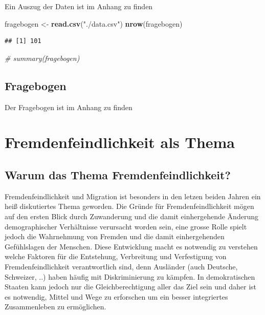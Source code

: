 \documentclass[]{article}
\newenvironment{Shaded}{\begin{snugshade}}{\end{snugshade}}
\newcommand{\KeywordTok}[1]{\textcolor[rgb]{0.13,0.29,0.53}{\textbf{{#1}}}}
\newcommand{\StringTok}[1]{\textcolor[rgb]{0.31,0.60,0.02}{{#1}}}
\newcommand{\CommentTok}[1]{\textcolor[rgb]{0.56,0.35,0.01}{\textit{{#1}}}}
\newcommand{\NormalTok}[1]{{#1}}
\begin{document}
Ein Auszug der Daten ist im Anhang zu finden

\begin{Shaded}
\begin{Highlighting}[]
\NormalTok{fragebogen <-}\StringTok{ }\KeywordTok{read.csv}\NormalTok{(}\StringTok{"./data.csv"}\NormalTok{)}
\KeywordTok{nrow}\NormalTok{(fragebogen)}
\end{Highlighting}
\end{Shaded}

\begin{verbatim}
## [1] 101
\end{verbatim}

\begin{Shaded}
\begin{Highlighting}[]
\CommentTok{# summary(fragebogen)}
\end{Highlighting}
\end{Shaded}

\subsection{Fragebogen}\label{fragebogen}

Der Fragebogen ist im Anhang zu finden

\clearpage

\section{Fremdenfeindlichkeit als Thema}

\subsection{Warum das Thema
Fremdenfeindlichkeit?}\label{warum-das-thema-fremdenfeindlichkeit}

Fremdenfeindlichkeit und Migration ist besonders in den letzen beiden
Jahren ein heiß diskutiertes Thema geworden. Die Gründe für
Fremdenfeindlichkeit mögen auf den ersten Blick durch Zuwanderung und
die damit einhergehende Änderung demographischer Verhältnisse verursacht
worden sein, eine grosse Rolle spielt jedoch die Wahrnehmung von Fremden
und die damit einhergehenden Gefühlslagen der Menschen. Diese
Entwicklung macht es notwendig zu verstehen welche Faktoren für die
Entstehung, Verbreitung und Verfestigung von Fremdenfeindlichkeit
verantwortlich sind, denn Ausländer (auch Deutsche, Schweizer, ..) haben
häufig mit Diskriminierung zu kämpfen. In demokratischen Staaten kann
jedoch nur die Gleichberechtigung aller das Ziel sein und daher ist es
notwendig, Mittel und Wege zu erforschen um ein besser integriertes
Zusammenleben zu ermöglichen.
\end{document}
